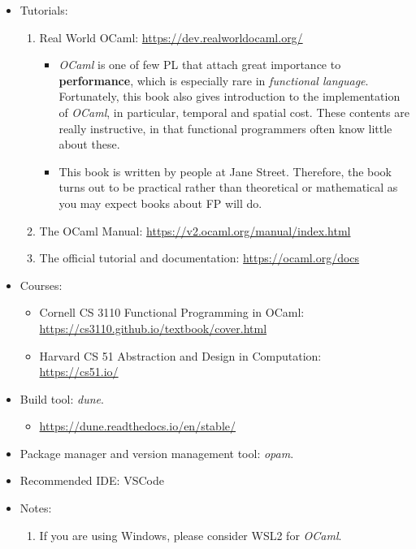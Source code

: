 \documentclass{article}
\begin{document}
\begin{itemize}
    \begin{itemize}
        \item Tutorials:
        \begin{enumerate}
            \item Real World OCaml:
            \href{https://dev.realworldocaml.org/}{https://dev.realworldocaml.org/}
            \begin{itemize}
                \item \emph{OCaml} is one of few PL that attach great importance to \textbf{performance}, which is especially rare in \emph{functional language}.
                Fortunately, this book also gives introduction to the implementation of \emph{OCaml}, in particular, temporal and spatial cost.
                These contents are really instructive, in that functional programmers often know little about these.
                \item This book is written by people at Jane Street.
                Therefore, the book turns out to be practical rather than theoretical or mathematical as you may expect books about FP will do.
            \end{itemize}
            \item The OCaml Manual:
            \href{https://v2.ocaml.org/manual/index.html}{https://v2.ocaml.org/manual/index.html}            
            \item The official tutorial and documentation:
            \href{https://ocaml.org/docs}{https://ocaml.org/docs}
        \end{enumerate}
        \item Courses:
        \begin{itemize}
            \item Cornell CS 3110
            Functional Programming in OCaml:\\
            \href{https://cs3110.github.io/textbook/cover.html}{https://cs3110.github.io/textbook/cover.html}
            \item Harvard CS 51
            Abstraction and Design in Computation:\\
            \href{https://cs51.io/}{https://cs51.io/}
        \end{itemize}
        \item Build tool:
        \emph{dune}.
        \begin{itemize}
            \item \href{https://dune.readthedocs.io/en/stable/}{https://dune.readthedocs.io/en/stable/}
        \end{itemize}
        \item Package manager and version management tool: \emph{opam}.
        \item Recommended IDE:
        VSCode
        \item Notes:
        \begin{enumerate}
            \item If you are using Windows, please consider WSL2 for \emph{OCaml}.
        \end{enumerate}
    \end{itemize}
    

\end{itemize}
\end{document}
